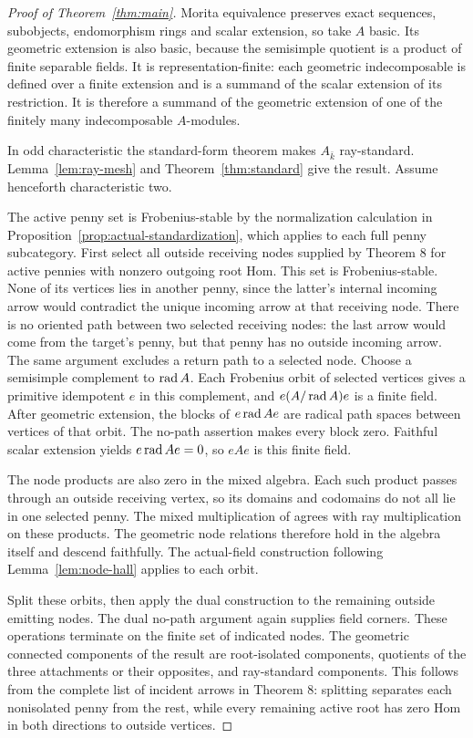 \begin{proof}[Proof of Theorem~\ref{thm:main}]
Morita equivalence preserves exact sequences, subobjects, endomorphism rings and scalar extension, so take $A$ basic. Its geometric extension is also basic, because the semisimple quotient is a product of finite separable fields. It is representation-finite: each geometric indecomposable is defined over a finite extension and is a summand of the scalar extension of its restriction. It is therefore a summand of the geometric extension of one of the finitely many indecomposable $A$-modules.

In odd characteristic the standard-form theorem \cite[Theorem 3]{Bongartz13} makes $A_{\bar k}$ ray-standard. Lemma~\ref{lem:ray-mesh} and Theorem~\ref{thm:standard} give the result. Assume henceforth characteristic two.

The active penny set is Frobenius-stable by the normalization calculation in Proposition~\ref{prop:actual-standardization}, which applies to each full penny subcategory. First select all outside receiving nodes supplied by Theorem 8 for active pennies with nonzero outgoing root Hom. This set is Frobenius-stable. None of its vertices lies in another penny, since the latter's internal incoming arrow would contradict the unique incoming arrow at that receiving node. There is no oriented path between two selected receiving nodes: the last arrow would come from the target's penny, but that penny has no outside incoming arrow. The same argument excludes a return path to a selected node. Choose a semisimple complement to $\operatorname{rad} A$. Each Frobenius orbit of selected vertices gives a primitive idempotent $e$ in this complement, and $e(A/\operatorname{rad} A)e$ is a finite field. After geometric extension, the blocks of $e\operatorname{rad} Ae$ are radical path spaces between vertices of that orbit. The no-path assertion makes every block zero. Faithful scalar extension yields $e\operatorname{rad} Ae=0$, so $eAe$ is this finite field.

The node products are also zero in the mixed algebra. Each such product passes through an outside receiving vertex, so its domains and codomains do not all lie in one selected penny. The mixed multiplication of \cite[Theorem 10]{Bongartz13} agrees with ray multiplication on these products. The geometric node relations therefore hold in the algebra itself and descend faithfully. The actual-field construction following Lemma~\ref{lem:node-hall} applies to each orbit.

Split these orbits, then apply the dual construction to the remaining outside emitting nodes. The dual no-path argument again supplies field corners. These operations terminate on the finite set of indicated nodes. The geometric connected components of the result are root-isolated components, quotients of the three attachments or their opposites, and ray-standard components. This follows from the complete list of incident arrows in Theorem 8: splitting separates each nonisolated penny from the rest, while every remaining active root has zero Hom in both directions to outside vertices.


\end{proof}
